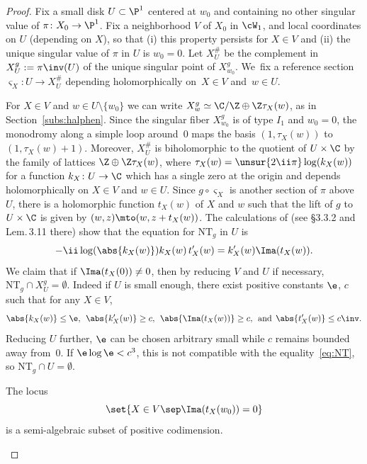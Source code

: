 \begin{proof}
Fix a small disk $U\subset \P^1$ centered at $w_0$ and containing no other singular value of $\pi\colon X_0\to \P^1$.
Fix a neighborhood $V$ of $X_0$ in $ \cW_1$, and local coordinates on $U$ (depending on $X$), so that (i) this property persists for $X\in V$ and (ii) the unique singular value of $\pi$ in $U$ is $w_0=0$. Let
$X^\#_U $ be the complement in $X_U^g:=\pi\inv(U)$ of the unique singular point of $X_{w_0}^g$. We~fix a reference section $\varsigma_X:U\to X^\#_U$ depending holomorphically on~$X\in V$ and~$w\in U$.

For $X\in V$ and $w\in U\setminus\{w_0\}$ we can write
$X_w^g\simeq \C/\Z\oplus \Z\tau_X(w)$, as in Section~\ref{subs:halphen}. Since the singular fiber $X_{w_0}^g$ is of type $I_1$ and $w_0=0$, the monodromy along a simple loop around~$0$ maps the basis $(1, \tau_X(w))$ to $(1, \tau_X(w)+1)$. Moreover,
$X^\#_U$ is biholomorphic to the quotient of $U\times \C$ by the family of lattices
$\Z\oplus \Z\tau_X(w)$, where $\tau_X(w) = \unsur{2\ii \pi} \log (k_X(w))$ for a function $k_X\colon U\to \C$ which has a single zero at the origin and depends holomorphically on $X\in V$ and $w\in U$.
Since
$g\circ \varsigma_X$ is another section of $\pi$ above $U$, there is a holomorphic function $t_X(w)$
of $X$ and $w$ such that the lift of $g$ to $U\times \C$ is given by $(w, z)\mto (w, z+ t_X(w))$.
The calculations of \cite{invariant}
(see \S 3.3.2 and Lem.\,3.11 there) show that the equation for $\mathrm{NT}_g$ in $U$ is
\begin{equation}\label{eq:NT}
- \ii \log(\abs{k_X(w)}) k_X(w) \, t_X'(w) = k_X'(w) \Ima(t_X(w)).
\end{equation}
We claim that if $\Ima(t_X(0)) \neq 0$, then by reducing $V$ and $U$ if necessary,
$\mathrm{NT}_g\cap X_U^g = \emptyset$. Indeed if $U$ is small enough,
there exist positive constants $\e$, $c$ such that for any $X\in V$,
\begin{equation*}
\abs{k_X(w)}\leq \e, \;\, \abs{k_X'(w)}\geq c, \;\,
\abs{\Ima(t_X(w))}\geq c, \;\, {\text{and}} \;\, \abs{t_X'(w)}\leq c\inv.
\end{equation*}
Reducing $U$ further,
$\e$ can be chosen arbitrary small while
$c$ remains bounded away from~$0$. If $\e\log\e < c^3$, this is not
compatible with the equality~\eqref{eq:NT}, so $\mathrm{NT}_g\cap U = \emptyset$.

\begin{lem}\label{lem:twisting_singular}
The locus
\begin{equation}\label{eq:analytic_equation}
\set{X\in V\sep \Ima(t_X(w_0)) = 0}
\end{equation}
is a semi-algebraic subset of positive codimension.
\end{lem}


\end{proof}
